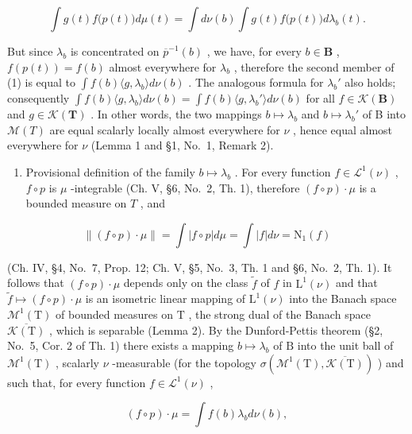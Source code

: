 \[
\int g (t) f \bigl (p (t) \bigr) d \mu (t) = \int d \nu (b) \int g (t) f \bigl (p (t) \bigr) d \lambda_ {b} (t).\tag{1}
\]

But since \(\lambda_{b}\) is concentrated on \(\overline{p}^{-1}(b)\) , we have, for every \(b \in \mathbf{B}\) , \(f(p(t)) = f(b)\) almost everywhere for \(\lambda_{b}\) , therefore the second member of (1) is equal to \(\int f(b)\langle g, \lambda_{b} \rangle d\nu(b)\) . The analogous formula for \(\lambda_{b}'\) also holds; consequently \(\int f(b)\langle g, \lambda_{b} \rangle d\nu(b) = \int f(b)\langle g, \lambda_{b}' \rangle d\nu(b)\) for all \(f \in \mathcal{K}(\mathbf{B})\) and \(g \in \mathcal{K}(\mathbf{T})\) . In other words, the two mappings \(b \mapsto \lambda_{b}\) and \(b \mapsto \lambda_{b}'\) of B into \(\mathcal{M}(T)\) are equal scalarly locally almost everywhere for \(\nu\) , hence equal almost everywhere for \(\nu\) (Lemma 1 and §1, No.~1, Remark 2).

\begin{enumerate}
\def\labelenumi{\arabic{enumi})}
\setcounter{enumi}{1}
\tightlist
\item
  Provisional definition of the family \(b \mapsto \lambda_b\) . For every function \(f \in \mathcal{L}^1(\nu)\) , \(f \circ p\) is \(\mu\) -integrable (Ch. V, §6, No.~2, Th. 1), therefore \((f \circ p) \cdot \mu\) is a bounded measure on \(T\) , and
\end{enumerate}

\[
\left\| (f \circ p) \cdot \mu \right\| = \int | f \circ p | d \mu = \int | f | d \nu = \mathrm{N} _ {1} (f)
\]

(Ch. IV, §4, No.~7, Prop. 12; Ch. V, §5, No.~3, Th. 1 and §6, No.~2, Th. 1). It follows that \((f \circ p) \cdot \mu\) depends only on the class \(\widetilde{f}\) of \(f\) in \(\mathrm{L}^1(\nu)\) and that \(\widetilde{f} \mapsto (f \circ p) \cdot \mu\) is an isometric linear mapping of \(\mathrm{L}^1(\nu)\) into the Banach space \(\mathcal{M}^1(\mathrm{T})\) of bounded measures on \(\mathrm{T}\) , the strong dual of the Banach space \(\overline{\mathcal{K}(\mathrm{T})}\) , which is separable (Lemma 2). By the Dunford-Pettis theorem (§2, No.~5, Cor. 2 of Th. 1) there exists a mapping \(b \mapsto \lambda_b\) of \(\mathrm{B}\) into the unit ball of \(\mathcal{M}^1(\mathrm{T})\) , scalarly \(\nu\) -measurable (for the topology \(\sigma(\mathcal{M}^1(\mathrm{T}), \overline{\mathcal{K}(\mathrm{T})})\) ) and such that, for every function \(f \in \mathcal{L}^1(\nu)\) ,

\[
(f \circ p) \cdot \mu = \int f (b) \lambda_ {b} d \nu (b),\tag{2}
\]

